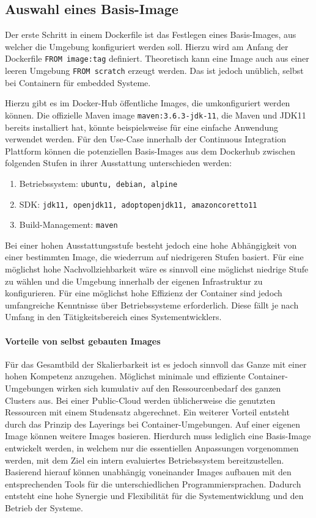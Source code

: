 \subsection{Auswahl eines Basis-Image}
Der erste Schritt in einem Dockerfile ist das Festlegen eines Basis-Images, aus welcher die Umgebung konfiguriert werden soll. Hierzu wird am Anfang der Dockerfile \lstinline{FROM image:tag} definiert. Theoretisch kann eine Image auch aus einer leeren Umgebung \lstinline{FROM scratch} erzeugt werden. Das ist jedoch unüblich, selbst bei Containern für embedded Systeme.

Hierzu gibt es im Docker-Hub öffentliche Images, die umkonfiguriert werden können. Die offizielle Maven image \lstinline{maven:3.6.3-jdk-11}, die Maven und JDK11 bereits installiert hat, könnte beispielsweise für eine einfache Anwendung verwendet werden. Für den Use-Case innerhalb der Continuous Integration Plattform können die potenziellen Basis-Images aus dem Dockerhub zwischen folgenden Stufen in ihrer Ausstattung unterschieden werden:
\begin{enumerate}
    \item Betriebssystem: \lstinline{ubuntu, debian, alpine}
    \item SDK: \lstinline{jdk11, openjdk11, adoptopenjdk11, amazoncoretto11}
    \item Build-Management: \lstinline{maven}
\end{enumerate}
Bei einer hohen Ausstattungsstufe besteht jedoch eine hohe Abhängigkeit von einer bestimmten Image, die wiederrum auf niedrigeren Stufen basiert. Für eine möglichst hohe Nachvollziehbarkeit wäre es sinnvoll eine möglichst niedrige Stufe zu wählen und die Umgebung innerhalb der eigenen Infrastruktur zu konfigurieren. Für eine möglichst hohe Effizienz der Container sind jedoch umfangreiche Kenntnisse über Betriebssysteme erforderlich. Diese fällt je nach Umfang in den Tätigkeitsbereich eines Systementwicklers.

\paragraph{Vorteile von selbst gebauten Images}
Für das Gesamtbild der Skalierbarkeit ist es jedoch sinnvoll das Ganze mit einer hohen Kompetenz anzugehen. Möglichst minimale und effiziente Container-Umgebungen wirken sich kumulativ auf den Ressourcenbedarf des ganzen Clusters aus. Bei einer Public-Cloud werden üblicherweise die genutzten Ressourcen mit einem Studensatz abgerechnet. Ein weiterer Vorteil entsteht durch das Prinzip des Layerings bei Container-Umgebungen. Auf einer eigenen Image können weitere Images basieren. Hierdurch muss lediglich eine Basis-Image entwickelt werden, in welchem nur die essentiellen Anpassungen vorgenommen werden, mit dem Ziel ein intern evaluiertes Betriebssystem bereitzustellen. Basierend hierauf können unabhängig voneinander Images aufbauen mit den entsprechenden Tools für die unterschiedlichen Programmiersprachen. Dadurch entsteht eine hohe Synergie und Flexibilität für die Systementwicklung und den Betrieb der Systeme.

